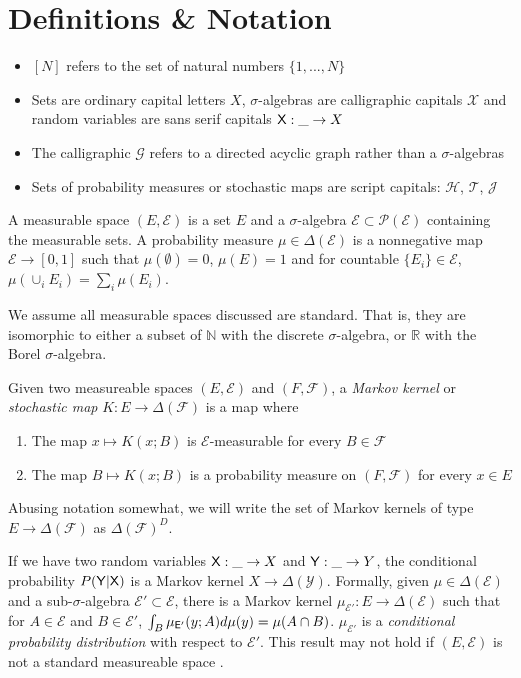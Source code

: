 \section{Definitions \& Notation}


\begin{itemize}
    \item $[N]$ refers to the set of natural numbers $\{1,...,N\}$
    \item Sets are ordinary capital letters $X$, $\sigma$-algebras are calligraphic capitals $\mathcal{X}$ and random variables are sans serif capitals $\mathsf{X}:\_\to X$
    \item The calligraphic $\mathcal{G}$ refers to a directed acyclic graph rather than a $\sigma$-algebras
    \item Sets of probability measures or stochastic maps are script capitals: $\mathscr{H}$, $\mathscr{T}$, $\mathscr{J}$
\end{itemize}

A measurable space $(E,\mathcal{E})$ is a set $E$ and a $\sigma$-algebra $\mathcal{E}\subset\mathcal{P}(\mathcal{E})$ containing the measurable sets. A probability measure $\mu\in \Delta(\mathcal{E})$ is a nonnegative map $\mathcal{E}\to[0,1]$ such that $\mu(\emptyset)=0$, $\mu(E)=1$ and for countable $\{E_i\}\in \mathcal{E}$, $\mu(\cup_i E_i) = \sum_i \mu(E_i)$.

We assume all measurable spaces discussed are standard. That is, they are isomorphic to either a subset of $\mathbb{N}$ with the discrete $\sigma$-algebra, or $\mathbb{R}$ with the Borel $\sigma$-algebra.

Given two measureable spaces $(E,\mathcal{E})$ and $(F,\mathcal{F})$, a \emph{Markov kernel} or \emph{stochastic map} $K:E\to \Delta(\mathcal{F})$ is a map where
\begin{enumerate}
    \item The map $x\mapsto K(x;B)$ is $\mathcal{E}$-measurable for every $B\in\mathcal{F}$
    \item The map $B\mapsto K(x;B)$ is a probability measure on $(F,\mathcal{F})$ for every $x\in E$
\end{enumerate}

Abusing notation somewhat, we will write the set of Markov kernels of type $E\to \Delta(\mathcal{F})$ as $\Delta(\mathcal{F})^D$. 

If we have two random variables $\mathsf{X}:\_\to X$ and $\mathsf{Y}:\_\to Y$, the conditional probability $P(\mathsf{Y}|\mathsf{X})$ is a Markov kernel $X\to \Delta(\mathcal{Y})$. Formally, given $\mu\in \Delta(\mathcal{E})$ and a sub-$\sigma$-algebra $\mathcal{E}'\subset\mathcal{E}$, there is a Markov kernel $\mu_{\mathcal{E}'}:E\to\Delta(\mathcal{E})$ such that for $A\in\mathcal{E}$ and $B\in \mathcal{E}'$, $\int_B \mu_{\mathsf{E}'}(y;A) d\mu(y) = \mu(A\cap B)$. $\mu_{\mathcal{E}'}$ is a \emph{conditional probability distribution} with respect to $\mathcal{E}'$. This result may not hold if $(E,\mathcal{E})$ is not a standard measureable space \citep{cinlar_probability_2011}.

